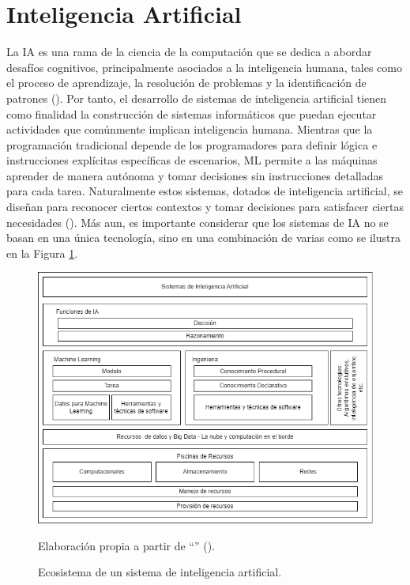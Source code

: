 \section{Inteligencia Artificial}
La IA es una rama de la ciencia de la computación que se dedica a abordar desafíos cognitivos, principalmente asociados a la inteligencia humana, tales como el proceso de aprendizaje, la resolución de problemas y la identificación de patrones (\cite{kim2019implementation}). Por tanto, el desarrollo de sistemas de inteligencia artificial tienen como finalidad la construcción de sistemas informáticos que puedan ejecutar actividades que comúnmente implican inteligencia humana. Mientras que la programación tradicional depende de los programadores para definir lógica e instrucciones explícitas específicas de escenarios, ML permite a las máquinas aprender de manera autónoma y tomar decisiones sin instrucciones detalladas para cada tarea. Naturalmente estos sistemas, dotados de inteligencia artificial, se diseñan para reconocer ciertos contextos y tomar decisiones para satisfacer ciertas necesidades (\cite{iso22989}).  Más aun, es importante considerar que los sistemas de IA no se basan en una única tecnología, sino en una combinación de varias como se ilustra en la Figura \ref{fig:ai_ecosystem}.
\begin{figure}[htb]
	\centering
	\includegraphics[width=1.0\textwidth]{images/marcoteorico/ai_ecosystem.png}
	\caption{Ecosistema de un sistema de inteligencia artificial.}
    \vspace{-0.2cm}
	\footnotesize{{Elaboración propia a partir de ``\textit{}'' (\citeyear{iso22989}).}}
	\label{fig:ai_ecosystem} 
\end{figure}

